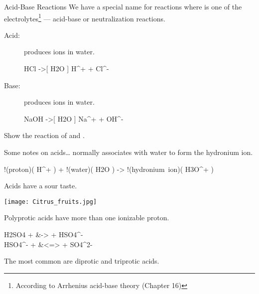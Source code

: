 \documentclass[notes=only]{beamer}
\begin{document}
\begin{frame}[t]{Acid-Base Reactions}
	We have a special name for reactions where  is one of the
	electrolytes\footnote{According to Arrhenius acid-base theory (Chapter 16)}
	--- \alert{acid-base} or \alert{neutralization}
	reactions.

	\begin{description}
		\item[Acid:] produces  ions in water.
			\begin{reaction*}
				HCl\aq{} ->[ H2O ] H^{+}\aq{} +
				Cl^{-}\aq{}
			\end{reaction*}
		\item[Base:] produces  ions in water.
			\begin{reaction*}
				NaOH\aq{} ->[ H2O ] Na^{+}\aq{} +
				OH^{-}\aq{}
			\end{reaction*}
	\end{description}

	\begin{example}
		Show the reaction of  and \ch{NaOH}.
	\end{example}

\end{frame}

\begin{frame}{Some notes on acids\ldots}
	 normally associates with water to form the
			\alert{hydronium ion}.
			\begin{reaction*}
				!(proton)( H^{+}\aq{} ) + !(water)( H2O\lqd{} )
				-> !(hydronium~ion)( H3O^{+}\aq{} )
			\end{reaction*}
			
			\bigskip

			\pause

		Acids have a sour taste. \hfill
			\parbox{0.5\linewidth}{
				\centering
				\texttt{[image: Citrus\_fruits.jpg]}
				}

			\bigskip

			\pause

		\alert{Polyprotic} acids have more than one
			\alert{ionizable} proton.
			\begin{reactions*}
				H2SO4\aq{} + \water\lqd{} &-> \Oxo\aq{} +
				HSO4^{-}\aq{} \\
				HSO4^{-}\aq{} + \water\lqd{} &<=> \Oxo\aq{} +
				SO4^{2-}\aq{}
			\end{reactions*}
			The most common are \alert{diprotic} and
			\alert{triprotic} acids.
\end{frame}
\end{document}
